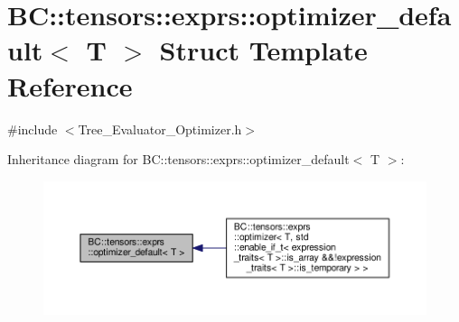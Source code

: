 \hypertarget{structBC_1_1tensors_1_1exprs_1_1optimizer__default}{}\section{BC\+:\+:tensors\+:\+:exprs\+:\+:optimizer\+\_\+default$<$ T $>$ Struct Template Reference}
\label{structBC_1_1tensors_1_1exprs_1_1optimizer__default}


{\ttfamily \#include $<$Tree\+\_\+\+Evaluator\+\_\+\+Optimizer.\+h$>$}



Inheritance diagram for BC\+:\+:tensors\+:\+:exprs\+:\+:optimizer\+\_\+default$<$ T $>$\+:
\nopagebreak
\begin{figure}[H]
\begin{center}
\leavevmode
\includegraphics[width=350pt]{structBC_1_1tensors_1_1exprs_1_1optimizer__default__inherit__graph}
\end{center}
\end{figure}
